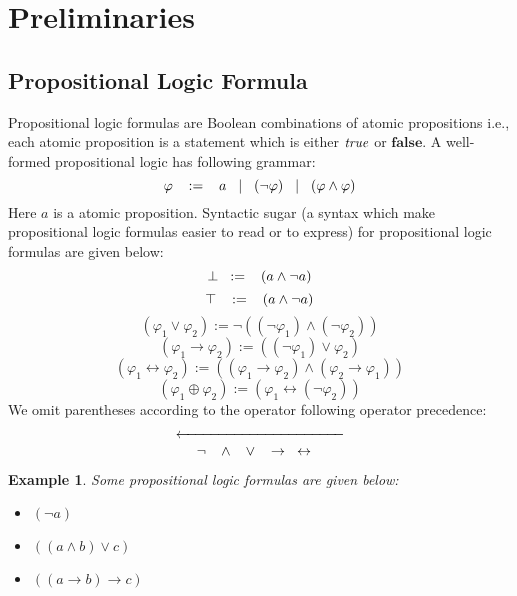 \newtheorem{example}{Example}
\section{Preliminaries}
\label{sec:preliminaries}
\subsection{Propositional Logic Formula}
Propositional logic formulas are Boolean combinations of atomic propositions i.e., each atomic proposition is a statement which is either $\emph{true}$ or $\mathbf{false}$. A well-formed propositional logic has following grammar:
$$\varphi\hspace{3mm} :=\hspace{3mm} a\hspace{3mm} |\hspace{3mm} (\neg \varphi)\hspace{3mm} |\hspace{3mm} (\varphi \wedge \varphi)$$
Here $a$ is a atomic proposition.\newline
Syntactic sugar (a syntax which make propositional logic formulas easier to read or to express) for propositional logic formulas are given below:
$$\perp\hspace{3mm}:=\hspace{3mm}(a\wedge\neg a)$$
$$\top\hspace{3mm}:=\hspace{3mm}(a\wedge\neg a)$$
$$(\varphi_{1}\vee\varphi_{2}) := \neg((\neg \varphi_{1}) \wedge (\neg \varphi_{2})) $$
$$(\varphi_{1}\rightarrow\varphi_{2}) := ((\neg \varphi_{1}) \vee \varphi_{2}) $$
$$(\varphi_{1}\leftrightarrow\varphi_{2}) := ( (\varphi_{1}\rightarrow\varphi_{2}) \wedge (\varphi_{2}\rightarrow\varphi_{1}))$$
$$(\varphi_{1}\oplus\varphi_{2}) := (\varphi_{1} \leftrightarrow (\neg \varphi_{2})) $$
We omit parentheses according to the operator following operator precedence:
\[ \xleftarrow{\hspace*{4cm}} \]
$$\neg\hspace{3mm} \wedge\hspace{3mm} \vee\hspace{3mm} \rightarrow\hspace{3mm} \leftrightarrow\hspace{3mm} $$
\begin{example}
	Some propositional logic formulas are given below:
	\begin{itemize}
	\item $(\neg a)$
	\item $((a\wedge b)\vee c)$
	\item $((a\rightarrow b)\rightarrow c)$
	\end{itemize}
\end{example}
